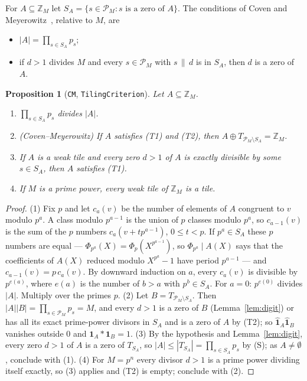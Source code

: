 \documentclass[11pt,a4paper]{amsart}
\newtheorem{proposition}[theorem]{Proposition}
\theoremstyle{definition}
\theoremstyle{remark}
\newcommand{\Z}{\mathbb{Z}}
\newcommand{\one}{\mathbf{1}}
\newcommand{\lean}[1]{\texttt{#1}}
\begin{document}
For $A\subseteq\Z_M$ let $S_A=\{s\in\mathcal P_M: s\text{ is a zero of }A\}$. The conditions of Coven and
Meyerowitz~\cite{CM}, relative to $M$, are
\begin{itemize}
\item[\textup{(T1)}] $|A|=\prod_{s\in S_A}p_s$;
\item[\textup{(T2)}] if $d>1$ divides $M$ and every $s\in\mathcal P_M$ with $s\,\|\,d$ is in $S_A$, then $d$ is a zero of $A$.
\end{itemize}

\begin{proposition}[\lean{CM}, \lean{TilingCriterion}]\label{prop:CM}
Let $A\subseteq\Z_M$.
\begin{enumerate}
\item $\prod_{s\in S_A}p_s$ divides $|A|$.
\item \textup{(Coven--Meyerowitz)} If $A$ satisfies \textup{(T1)} and \textup{(T2)}, then
 $A\oplus T_{\mathcal P_M\setminus S_A}=\Z_M$.
\item If $A$ is a weak tile and every zero $d>1$ of $A$ is exactly divisible by some $s\in S_A$, then $A$ satisfies
 \textup{(T1)}.
\item If $M$ is a prime power, every weak tile of $\Z_M$ is a tile.
\end{enumerate}
\end{proposition}
\begin{proof}
(1) Fix $p$ and let $c_a(v)$ be the number of elements of $A$ congruent to $v$ modulo $p^a$. A class modulo
$p^{a-1}$ is the union of $p$ classes modulo $p^a$, so $c_{a-1}(v)$ is the sum of the $p$ numbers
$c_a(v+tp^{a-1})$, $0\le t<p$. If $p^a\in S_A$ these $p$ numbers are equal --- $\Phi_{p^a}(X)=\Phi_p(X^{p^{a-1}})$,
so $\Phi_{p^a}\mid A(X)$ says that the coefficients of $A(X)$ reduced modulo $X^{p^a}-1$ have period $p^{a-1}$ ---
and $c_{a-1}(v)=p\,c_a(v)$. By downward induction on $a$, every $c_a(v)$ is divisible by $p^{e(a)}$, where $e(a)$ is
the number of $b>a$ with $p^b\in S_A$. For $a=0$: $p^{e(0)}$ divides $|A|$. Multiply over the primes $p$. (2) Let $B=T_{\mathcal P_M\setminus S_A}$.
Then $|A||B|=\prod_{s\in\mathcal P_M}p_s=M$, and every $d>1$ is a zero of $B$ (Lemma~\ref{lem:digit}) or has all
its exact prime-power divisors in $S_A$ and is a zero of $A$ by (T2); so $\hat{\one}_A\hat{\one}_B$ vanishes
outside $0$ and $\one_A*\one_B=1$. (3) By the hypothesis and Lemma~\ref{lem:digit}, every zero $d>1$ of $A$ is a zero of $T_{S_A}$, so
$|A|\le|T_{S_A}|=\prod_{s\in S_A}p_s$ by (S); as $A\ne\emptyset$, conclude with (1). (4) For $M=p^n$ every divisor $d>1$ is a prime
power dividing itself exactly, so (3) applies and (T2) is empty; conclude with (2).
\end{proof}
\end{document}
